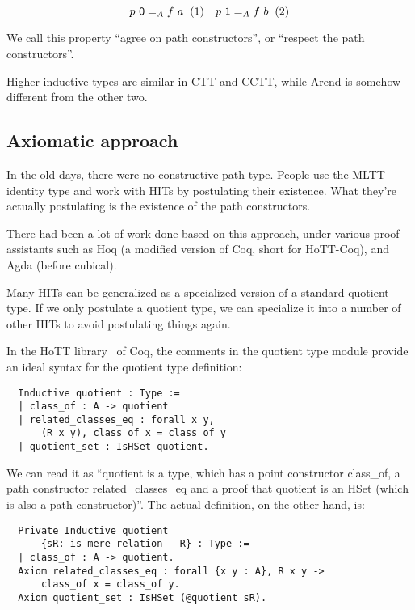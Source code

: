 \[
  p\ \textsf 0 =_A f\ a
  \xtag
  \quad
  p\ \textsf 1 =_A f\ b
  \xtag
\]

We call this property ``agree on path constructors'',
or ``respect the path constructors''.

Higher inductive types are similar in CTT and CCTT,
while Arend is somehow different from the other two.

\subsection{Axiomatic approach}
\label{subsec:axiomatic}

In the old days, there were no constructive path type.
People use the MLTT identity type and
work with HITs by postulating their existence.
What they're actually postulating is the existence of the path constructors.

There had been a lot of work done based on this approach,
under various proof assistants such as Hoq
(a modified version of Coq, short for HoTT-Coq),
and Agda (before cubical).

Many HITs can be generalized as a specialized version of a standard
quotient type. If we only postulate a quotient type, we can specialize
it into a number of other HITs to avoid postulating things again.

In the HoTT library~\cite{HottCoq} of Coq, the comments in the quotient
type module provide an ideal syntax for the quotient type definition:

\begin{verbatim}
  Inductive quotient : Type :=
  | class_of : A -> quotient
  | related_classes_eq : forall x y,
      (R x y), class_of x = class_of y
  | quotient_set : IsHSet quotient.
\end{verbatim}

We can read it as ``\textsf{quotient} is a type,
which has a point constructor \textsf{class\_of},
a path constructor \textsf{related\_classes\_eq}
and a proof that \textsf{quotient} is an HSet
(which is also a path constructor)''.
The \href{https://github.com/HoTT/HoTT/blob/b20bb573739284349a968bb219405255c744049d/theories/HIT/quotient.v#L40-L42}
{actual definition}, on the other hand, is:

\begin{verbatim}
  Private Inductive quotient
      {sR: is_mere_relation _ R} : Type :=
  | class_of : A -> quotient.
  Axiom related_classes_eq : forall {x y : A}, R x y ->
      class_of x = class_of y.  
  Axiom quotient_set : IsHSet (@quotient sR).
\end{verbatim}

